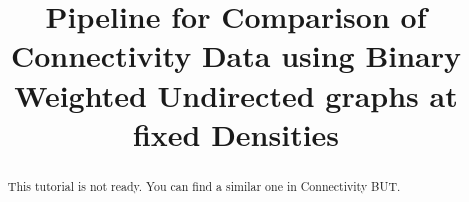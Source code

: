\documentclass[justified]{tufte-handout}
\title{Pipeline for Comparison of Connectivity Data using Binary Weighted Undirected graphs at fixed Densities}
\begin{document}
\maketitle

\begin{abstract}
\noindent
This tutorial is not ready. You can find a similar one in Connectivity BUT.
\end{abstract}
\end{document}

